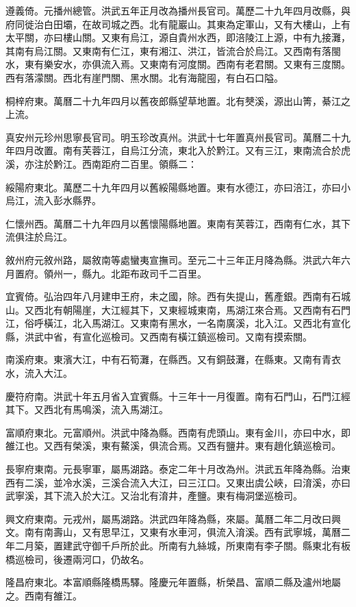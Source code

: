 遵義倚。元播州總管。洪武五年正月改為播州長官司。萬歷二十九年四月改縣，與府同徙治白田壩，在故司城之西。北有龍巖山。其東為定軍山，又有大樓山，上有太平關，亦曰樓山關。又東有烏江，源自貴州水西，即涪陵江上源，中有九接灘，其南有烏江關。又東南有仁江，東有湘江、洪江，皆流合於烏江。又西南有落閩水，東有樂安水，亦俱流入焉。又東南有河度關。西南有老君關。又東有三度關。西有落濛關。西北有崖門關、黑水關。北有海龍囤，有白石口隘。

桐梓府東。萬曆二十九年四月以舊夜郎縣望草地置。北有僰溪，源出山箐，綦江之上流。

真安州元珍州思寧長官司。明玉珍改真州。洪武十七年置真州長官司。萬曆二十九年四月改置。南有芙蓉江，自烏江分流，東北入於黔江。又有三江，東南流合於虎溪，亦注於黔江。西南距府二百里。領縣二：

綏陽府東北。萬歷二十九年四月以舊綏陽縣地置。東有水德江，亦曰涪江，亦曰小烏江，流入彭水縣界。

仁懷州西。萬曆二十九年四月以舊懷陽縣地置。東南有芙蓉江，西南有仁水，其下流俱注於烏江。

敘州府元敘州路，屬敘南等處蠻夷宣撫司。至元二十三年正月降為縣。洪武六年六月置府。領州一，縣九。北距布政司千二百里。

宜賓倚。弘治四年八月建申王府，未之國，除。西有失提山，舊產銀。西南有石城山。又西北有朝陽崖，大江經其下，又東經城東南，馬湖江來合焉。又西南有石門江，俗呼橫江，北入馬湖江。又東南有黑水，一名南廣溪，北入江。又西北有宣化縣，洪武中省，有宣化巡檢司。又西南有橫江鎮巡檢司。又南有摸索關。

南溪府東。東濱大江，中有石筍灘，在縣西。又有銅鼓灘，在縣東。又南有青衣水，流入大江。

慶符府南。洪武十年五月省入宜賓縣。十三年十一月復置。南有石門山，石門江經其下。又西北有馬鳴溪，流入馬湖江。

富順府東北。元富順州。洪武中降為縣。西南有虎頭山。東有金川，亦曰中水，即雒江也。又西有榮溪，東有鰲溪，俱流合焉。又西有鹽井。東有趙化鎮巡檢司。

長寧府東南。元長寧軍，屬馬湖路。泰定二年十月改為州。洪武五年降為縣。治東西有二溪，並冷水溪，三溪合流入大江，曰三江口。又東出虞公峽，曰淯溪，亦曰武寧溪，其下流入於大江。又治北有淯井，產鹽。東有梅洞堡巡檢司。

興文府東南。元戎州，屬馬湖路。洪武四年降為縣，來屬。萬曆二年二月改曰興文。南有南壽山，又有思早江，又東有水車河，俱流入淯溪。西有武寧城，萬曆二年二月築，置建武守御千戶所於此。所南有九絲城，所東南有李子關。縣東北有板橋巡檢司，後遷兩河口，仍故名。

隆昌府東北。本富順縣隆橋馬驛。隆慶元年置縣，析榮昌、富順二縣及瀘州地屬之。西南有雒江。

